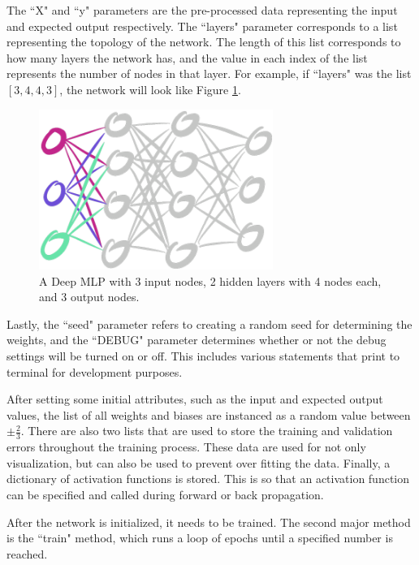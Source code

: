 \documentclass[12pt]{report}
\begin{document}
The ``X" and ``y" parameters are the pre-processed data representing the input and expected output respectively. The ``layers"  parameter corresponds to a list representing the topology of the network. The length of this list corresponds to how many layers the network has, and the value in each index of the list represents the number of nodes in that layer. For example, if ``layers" was the list $[3, 4, 4, 3]$, the network will look like Figure \ref{3443}.
\begin{figure}[hbt!]
    \centering
    \includegraphics[width=3in]{figures/3443.png}
    \caption{A Deep MLP with 3 input nodes, 2 hidden layers with 4 nodes each, and 3 output nodes.}
    \label{3443}
\end{figure}
Lastly, the ``seed" parameter refers to creating a random seed for determining the weights, and the ``DEBUG" parameter determines whether or not the debug settings will be turned on or off. This includes various statements that print to terminal for development purposes.

After setting some initial attributes, such as the input and expected output values, the list of all weights and biases are instanced as a random value between $\pm \frac{2}{3}$. There are also two lists that are used to store the training and validation errors throughout the training process. These data are used for not only visualization, but can also be used to prevent over fitting the data. Finally, a dictionary of activation functions is stored. This is so that an activation function can be specified and called during forward or back propagation.

After the network is initialized, it needs to be trained. The second major method is the ``train" method, which runs a loop of epochs until a specified number is reached.


\end{document}
